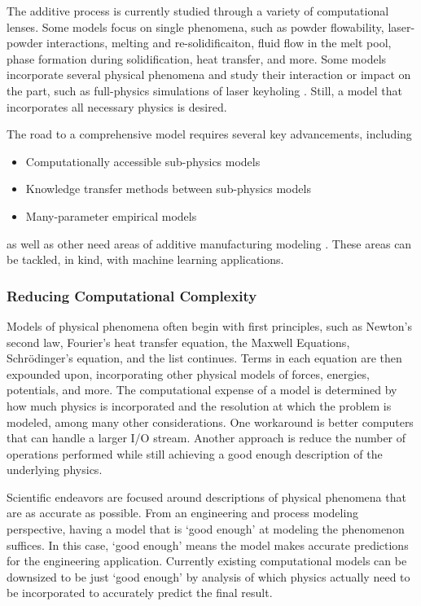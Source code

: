 The additive process is currently studied through a variety of computational lenses. Some models focus on single phenomena, such as powder flowability, laser-powder interactions, melting and re-solidificaiton, fluid flow in the melt pool, phase formation during solidification, heat transfer, and more. Some models incorporate several physical phenomena and study their interaction or impact on the part, such as full-physics simulations of laser keyholing \cite{King2014}. Still, a model that incorporates all necessary physics is desired. 

The road to a comprehensive model requires several key advancements, including
\begin{itemize}
	\item Computationally accessible sub-physics models
	\item Knowledge transfer methods between sub-physics models
	\item Many-parameter empirical models
\end{itemize}
as well as other need areas of additive manufacturing modeling \cite{King2015b}. These areas can be tackled, in kind, with machine learning applications.
	
	
\subsubsection{Reducing Computational Complexity}
Models of physical phenomena often begin with first principles, such as Newton's second law, Fourier's heat transfer equation, the Maxwell Equations, Schr\"odinger's equation, and the list continues. Terms in each equation are then expounded upon, incorporating other physical models of forces, energies, potentials, and more. The computational expense of a model is determined by how much physics is incorporated and the resolution at which the problem is modeled, among many other considerations. One workaround is better computers that can handle a larger I/O stream. Another approach is reduce the number of operations performed while still achieving a good enough description of the underlying physics.

Scientific endeavors are focused around descriptions of physical phenomena that are as accurate as possible. From an engineering and process modeling perspective, having a model that is `good enough' at modeling the phenomenon suffices. In this case, `good enough' means the model makes accurate predictions for the engineering application. Currently existing computational models can be downsized to be just `good enough' by analysis of which physics actually need to be incorporated to accurately predict the final result. 


